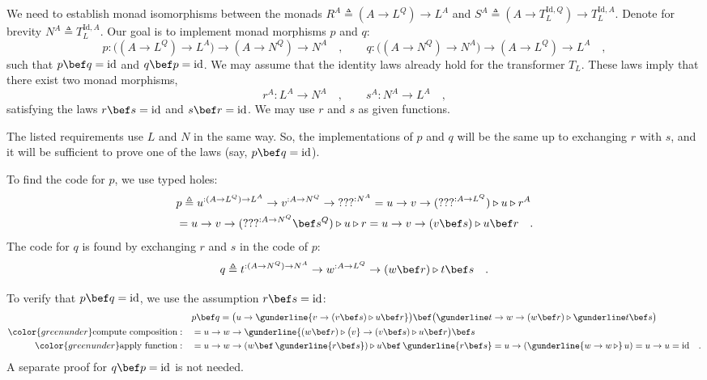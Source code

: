 We need to establish monad isomorphisms between the monads $R^{A}\triangleq(A\rightarrow L^{Q})\rightarrow L^{A}$
and $S^{A}\triangleq(A\rightarrow T_{L}^{\text{Id},Q})\rightarrow T_{L}^{\text{Id},A}$.
Denote for brevity $N^{A}\triangleq T_{L}^{\text{Id},A}$. Our goal
is to implement monad morphisms $p$ and $q$:
\[
p:\big((A\rightarrow L^{Q})\rightarrow L^{A}\big)\rightarrow(A\rightarrow N^{Q})\rightarrow N^{A}\quad,\quad\quad q:\big((A\rightarrow N^{Q})\rightarrow N^{A}\big)\rightarrow(A\rightarrow L^{Q})\rightarrow L^{A}\quad,
\]
such that $p\bef q=\text{id}$ and $q\bef p=\text{id}$. We may assume
that the identity laws already hold for the transformer $T_{L}$.
These laws imply that there exist two monad morphisms,
\[
r^{A}:L^{A}\rightarrow N^{A}\quad,\quad\quad s^{A}:N^{A}\rightarrow L^{A}\quad,
\]
 satisfying the laws $r\bef s=\text{id}$ and $s\bef r=\text{id}$.
We may use $r$ and $s$ as given functions.

The listed requirements use $L$ and $N$ in the same way. So, the
implementations of $p$ and $q$ will be the same up to exchanging
$r$ with $s$, and it will be sufficient to prove one of the laws
(say, $p\bef q=\text{id}$).

To find the code for $p$, we use typed holes:
\begin{align*}
 & p\triangleq u^{:(A\rightarrow L^{Q})\rightarrow L^{A}}\rightarrow v^{:A\rightarrow N^{Q}}\rightarrow\text{???}^{:N^{A}}=u\rightarrow v\rightarrow(\text{???}^{:A\rightarrow L^{Q}})\triangleright u\triangleright r^{A}\\
 & =u\rightarrow v\rightarrow(\text{???}^{:A\rightarrow N^{Q}}\bef s^{Q})\triangleright u\triangleright r=u\rightarrow v\rightarrow(v\bef s)\triangleright u\bef r\quad.
\end{align*}
The code for $q$ is found by exchanging $r$ and $s$ in the code
of $p$:
\[
q\triangleq t^{:(A\rightarrow N^{Q})\rightarrow N^{A}}\rightarrow w^{:A\rightarrow L^{Q}}\rightarrow(w\bef r)\triangleright t\bef s\quad.
\]

To verify that $p\bef q=\text{id}$, we use the assumption $r\bef s=\text{id}$:
\begin{align*}
 & p\bef q=\big(u\rightarrow\gunderline{v\rightarrow(v\bef s)\triangleright u\bef r}\big)\bef\big(\gunderline t\rightarrow w\rightarrow(w\bef r)\triangleright\gunderline t\bef s\big)\\
{\color{greenunder}\text{compute composition}:}\quad & =u\rightarrow w\rightarrow\gunderline{(w\bef r)\triangleright\big(v}\rightarrow(v\bef s)\triangleright u\bef r\big)\bef s\\
{\color{greenunder}\text{apply function}:}\quad & =u\rightarrow w\rightarrow(w\bef\,\gunderline{r\bef s})\triangleright u\bef\,\gunderline{r\bef s}=u\rightarrow(\gunderline{w\rightarrow w\,\triangleright}\,u)=u\rightarrow u=\text{id}\quad.
\end{align*}
A separate proof for $q\bef p=\text{id}$ is not needed.

